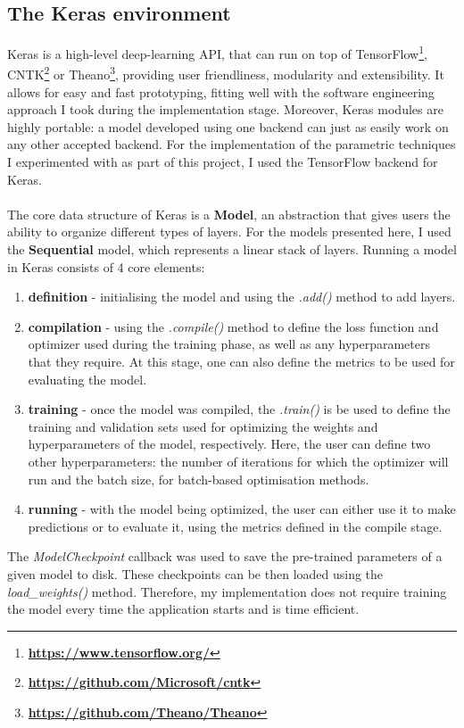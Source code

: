 	\subsection{The Keras environment} \label{Section: impl/ml/ecosys}
	Keras is a high-level deep-learning API, that can run on top of TensorFlow\footnote{\textbf{\url{https://www.tensorflow.org/}}}, CNTK\footnote{\textbf{\url{https://github.com/Microsoft/cntk}}} or Theano\footnote{\textbf{\url{https://github.com/Theano/Theano}}}, providing user friendliness, modularity and extensibility. It allows for easy and fast prototyping, fitting well with the software engineering approach I took during the implementation stage. Moreover, Keras modules are highly portable: a model developed using one backend can just as easily work on any other accepted backend. For the implementation of the parametric techniques I experimented with as part of this project, I used the TensorFlow backend for Keras. 
	\\ \\
	The core data structure of Keras is a \textbf{Model}, an abstraction that gives users the ability to organize different types of layers. For the models presented here, I used the \textbf{Sequential} model, which represents a linear stack of layers. Running a model in Keras consists of 4 core elements:
	\begin{enumerate}
		\item \textbf{definition} - initialising the model and using the \textit{.add()} method to add layers.
		
		\item \textbf{compilation} - using the \textit{.compile()} method to define the loss function and optimizer used during the training phase, as well as any hyperparameters that they require. At this stage, one can also define the metrics to be used for evaluating the model. 
		
		\item \textbf{training} - once the model was compiled, the \textit{.train()} is be used to define the training and validation sets used for optimizing the weights and hyperparameters of the model, respectively. Here, the user can define two other hyperparameters: the number of iterations for which the optimizer will run and the batch size, for batch-based optimisation methods. 
		
		\item \textbf{running} - with the model being optimized, the user can either use it to make predictions or to evaluate it, using the metrics defined in the compile stage. 
	\end{enumerate}
	The \textit{ModelCheckpoint} callback was used to save the pre-trained parameters of a given model to disk. These checkpoints can be then loaded using the \textit{load\_weights()} method. Therefore, my implementation does not require training the model every time the application starts and is time efficient.
	
